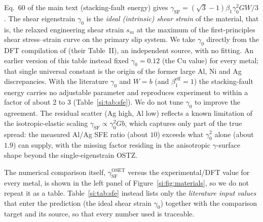 \documentclass[11pt]{article}
\newcommand{\g}{\gamma_0}
\begin{document}
Eq.~60 of the main text (stacking-fault energy) gives
$\gamma_\text{SF}=(\sqrt3-1)\beta_1\g^2GW/3$. The shear eigenstrain
$\g$ is the \emph{ideal (intrinsic) shear strain} of the material, that
is, the relaxed engineering shear strain $s_m$ at the maximum of the
first-principles shear stress--strain curve on the primary slip system.
We take $\g$ directly from the DFT compilation of
\citet{S_ogata2004} (their Table~II), an independent source, with
no fitting. An earlier version of this table instead fixed $\g=0.12$
(the Cu value) for every metal; that single universal constant is the
origin of the former large Al, Ni and Ag discrepancies. With the
literature $\g$ and $W=b$ (and $\beta_1^\text{eff}=1$) the stacking-fault
energy carries no adjustable parameter and reproduces experiment to
within a factor of about $2$ to $3$ (Table~\ref{si:tab:sfe}). We do not
tune $\g$ to improve the agreement. The residual scatter (Ag high, Al
low) reflects a known limitation of the isotropic-elastic scaling
$\gamma_\text{SF}\propto\g^2Gb$, which captures only part of the true
spread: the measured Al/Ag SFE ratio (about $10$) exceeds what $\g^2$
alone (about $1.9$) can supply, with the missing factor residing in the
anisotropic $\gamma$-surface shape beyond the single-eigenstrain OSTZ.

The numerical comparison itself, $\gamma_\text{SF}^\text{OSET}$ versus
the experimental/DFT value for every metal, is shown in the left
panel of Figure~\ref{si:fig:materials}, so we do not repeat it as a table.
Table~\ref{si:tab:sfe} instead lists only the \emph{literature input
values} that enter the prediction (the ideal shear strain $\g$) together
with the comparison target and its source, so that every number used is
traceable.
\end{document}
